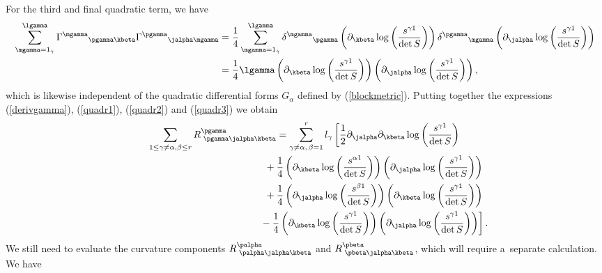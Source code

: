 For the third and final quadratic term, we have
\begin{align}
\sum_{\mgamma=1_{\gamma}}^{\lgamma}{\Gamma^{\mgamma}}_{\pgamma \kbeta}{\Gamma^{\pgamma}}_{\jalpha \mgamma} &=\frac{1}{4}\sum_{\mgamma=1_{\gamma}}^{\lgamma}{\delta^{\mgamma}}_{\pgamma}\left(\partial_{\kbeta}\log\left(\frac{s^{\gamma 1}}{\det S}\right)\right){\delta^{\pgamma}}_{\mgamma}\left(\partial_{\jalpha}\log\left(\frac{s^{\gamma 1}}{\det S}\right)\right)\nonumber\\
&=\frac{1}{4}\lgamma \left(\partial_{\kbeta}\log\left(\frac{s^{\gamma 1}}{\det S}\right)\right)\left(\partial_{\jalpha}\log\left(\frac{s^{\gamma 1}}{\det S}\right)\right),\label{quadr3}
\end{align}
which is likewise independent of the quadratic differential forms $G_{\alpha}$ defined by (\ref{blockmetric}). Putting together the expressions (\ref{derivgamma}), (\ref{quadr1}), (\ref{quadr2}) and (\ref{quadr3}) we obtain
\begin{gather}
\sum_{1\leq \gamma \neq \alpha, \beta\leq r}R^{\pgamma}_{{\phantom l} \pgamma \jalpha \kbeta}=\sum_{\gamma \neq \alpha, \,\beta =1}^{r}l_{\gamma}\left[\frac{1}{2}\partial_{\jalpha}\partial_{\kbeta}\log\left(\frac{s^{\gamma 1}}{\det S}\right)\right.\nonumber\\
\hphantom{\sum_{1\leq \gamma \neq \alpha, \beta\leq r}R^{\pgamma}_{{\phantom l} \pgamma \jalpha \kbeta}=}{}
+\frac{1}{4}\left(\partial_{\kbeta}\log\left(\frac{s^{\alpha 1}}{\det S}\right)\right)\left(\partial_{\jalpha}\log\left(\frac{s^{\gamma 1}}{\det S}\right)\right)\nonumber\\
\hphantom{\sum_{1\leq \gamma \neq \alpha, \beta\leq r}R^{\pgamma}_{{\phantom l} \pgamma \jalpha \kbeta}=}{}
+ \frac{1}{4}\left(\partial_{\jalpha}\log\left(\frac{s^{\beta 1}}{\det S}\right)\right)\left(\partial_{\kbeta}\log\left(\frac{s^{\gamma 1}}{\det S}\right)\right)\nonumber\\
\left.\hphantom{\sum_{1\leq \gamma \neq \alpha, \beta\leq r}R^{\pgamma}_{{\phantom l} \pgamma \jalpha \kbeta}=}{}
-\frac{1}{4}\left(\partial_{\kbeta}\log\left(\frac{s^{\gamma 1}}{\det S}\right)\right)\left(\partial_{\jalpha}\log\left(\frac{s^{\gamma 1}}{\det S}\right)\right)\right].\label{Riccidecomp1}
\end{gather}
We still need to evaluate the curvature components $R^{\palpha}_{{\phantom l} \palpha \jalpha \kbeta}$ and $R^{\pbeta}_{{\phantom l} \pbeta \jalpha \kbeta}$, which will require a~separate calculation. We have
